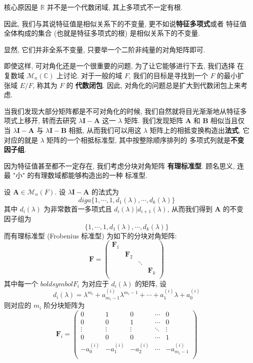 \documentclass[UTF8]{book}
\begin{document}
核心原因是 $\mathbb{R}$ 并不是一个代数闭域, 
其上多项式不一定有根. 

因此, 我们与其说特征值是相似关系下的不变量, 更不如说\textbf{特征多项式}或者
特征值全体构成的集合 (也就是特征多项式的根) 是相似关系下的不变量. 

显然, 它们并非全系不变量, 只要举一个二阶非纯量的对角矩阵即可. 

即使这样, 可对角化还是一个很重要的问题, 为了让它能够进行下去, 我们选择
在复数域 $\mathcal{M}_{n}(\mathbb{C})$ 上讨论. 对于一般的域 $F$, 
我们的目标是寻找到一个 $F$ 的最小扩张域 $E/F$, 称其为 $F$ 的
\textbf{代数闭包}. 因此, 对角化的问题总是扩大到代数闭包上来考虑. 

当我们发现大部分矩阵都是不可对角化的时候, 
我们自然就将目光渐渐地从特征多项式上移开, 转而去研究 
$\lambda \boldsymbol{I}-\boldsymbol{A}$ 这一 $\lambda$ 矩阵. 
我们发现矩阵 $\boldsymbol{A}$ 和 $\boldsymbol{B}$ 相似当且仅当 
$\lambda \boldsymbol{I}-\boldsymbol{A}$ 与 
$\lambda \boldsymbol{I}-\boldsymbol{B}$ 相抵, 
从而我们可以用这 $\lambda$ 矩阵上的相抵变换构造出\textbf{法式}, 
它对应的就是 $\lambda$ 矩阵的一个相抵标准型, 其中按整除顺序排列的
多项式列就是\textbf{不变因子组}. 

因为特征值甚至都不一定存在, 我们考虑分块对角矩阵
\textbf{有理标准型}. 顾名思义, 连最 "小" 的有理数域都能够构造出的一种
标准型. 

设 $\boldsymbol{A} \in \mathcal{M}_{n}(F)$. 
设 $\lambda \boldsymbol{I}-\boldsymbol{A}$ 的法式为 
$$ diga\{1,\cdots,1,d_1(\lambda),\cdots,d_k(\lambda)\} $$
其中 $d_i(\lambda)$ 为非常数首一多项式且 $d_i(\lambda)|d_{i+1}(\lambda)$, 
从而我们得到 $\boldsymbol{A}$ 的不变因子组为 
$$ \{1,\cdots,1,d_1(\lambda),\cdots,d_k(\lambda)\} $$
而有理标准型 (Frobenius 标准型) 为如下的分块对角矩阵: 
$$
\boldsymbol{F}=
\begin{pmatrix}
    \boldsymbol{F}_1 &  &  &  \\
    & \boldsymbol{F}_2 & &   \\
    & &  \ddots&   \\
    & & &  \boldsymbol{F}_k \\
\end{pmatrix}
$$
其中每一个 $boldsymbol{F}_i$ 为对应于 $d_i(\lambda)$ 的矩阵, 
设 
$$ d_i(\lambda) = \lambda^{m_i} + a^{(i)}_{m_i-1}\lambda^{m_i-1} +
\cdots + a_1^{(i)} \lambda + a_0^{(i)}  $$ 
则对应的 $m_i$ 阶分块矩阵为
$$
\boldsymbol{F}_i=
\begin{pmatrix}
    0 & 1 & 0 & \cdots & 0 \\
    0 & 0 & 1 & \cdots & 0  \\
    \vdots & \vdots  &\vdots & \ddots & \vdots \\
    0 & 0 & 0 & \cdots & 1 \\
    -a_0^{(i)} & -a_{1}^{(i)} & -a_{2}^{(i)} &\cdots & - a^{(i)}_{m_i-1}\\
\end{pmatrix}
$$
\end{document}
